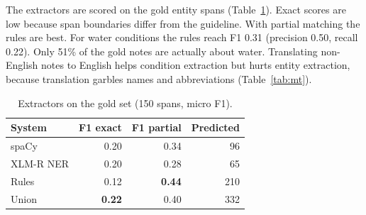 \begin{table}[htbp]
\centering\small
\caption{Agreement: relevance and condition $\kappa$, span F1 (exact / partial).}
\label{tab:agreement}
\end{table}

The extractors are scored on the gold entity spans (Table~\ref{tab:extractors}). Exact scores are low because span
boundaries differ from the guideline. With partial matching the rules are best.
For water conditions the rules reach F1 0.31 (precision 0.50, recall 0.22). Only 51\% of the
gold notes are actually about water. Translating non-English notes to English helps condition extraction but
hurts entity extraction, because translation garbles names and abbreviations (Table~\ref{tab:mt}).

\begin{table}[htbp]
\centering\small
\caption{Extractors on the gold set (150 spans, micro F1).}
\label{tab:extractors}
\begin{tabular}{lrrr}
\toprule
System & F1 exact & F1 partial & Predicted \\
\midrule
spaCy & 0.20 & 0.34 & 96 \\
XLM-R NER & 0.20 & 0.28 & 65 \\
Rules & 0.12 & \textbf{0.44} & 210 \\
Union & \textbf{0.22} & 0.40 & 332 \\
\bottomrule
\end{tabular}
\end{table}

\begin{table}[htbp]
\centering\small
\caption{Extraction F1 on English originals vs non-English notes, original and machine-translated.}
\label{tab:mt}
\end{table}
